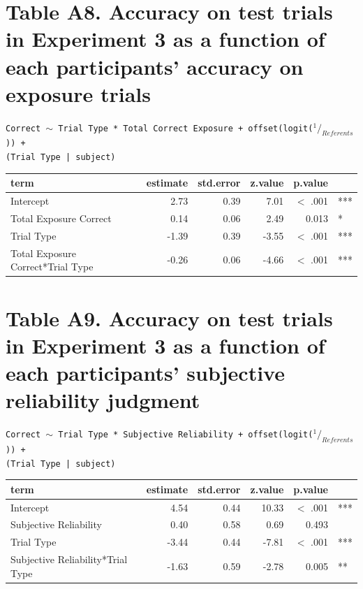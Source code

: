 \documentclass[authoryear, review]{elsarticle}
\begin{document}
\section*{Table A8. Accuracy on test trials in Experiment 3 as a function of each participants' accuracy on exposure trials}

\texttt{Correct $\sim$ Trial Type * Total Correct Exposure + offset(logit($^1/_{Referents}$)) + \\ (Trial Type | subject)}

\begin{table}[h]
\centering
\begin{tabular}{lrrrrl}
 term & estimate & std.error & z.value & p.value &  \\ 
  \hline
Intercept & 2.73 & 0.39 & 7.01 & $<$ .001 & *** \\ 
  Total Exposure Correct & 0.14 & 0.06 & 2.49 & 0.013 & * \\ 
  Trial Type & -1.39 & 0.39 & -3.55 & $<$ .001 & *** \\ 
  Total Exposure Correct*Trial Type & -0.26 & 0.06 & -4.66 & $<$ .001 & *** \\ 
   \hline
\end{tabular}
\label{tab:e3_acc_gaze_use}
\end{table}

\newpage

\section*{Table A9. Accuracy on test trials in Experiment 3 as a function of each participants' subjective reliability judgment}

\texttt{Correct $\sim$ Trial Type * Subjective Reliability + offset(logit($^1/_{Referents}$)) + \\ (Trial Type | subject)}

\begin{table}[h]
\centering
\begin{tabular}{lrrrrl}
 term & estimate & std.error & z.value & p.value &  \\ 
  \hline
Intercept & 4.54 & 0.44 & 10.33 & $<$ .001 & *** \\ 
  Subjective Reliability & 0.40 & 0.58 & 0.69 & 0.493 &  \\ 
  Trial Type & -3.44 & 0.44 & -7.81 & $<$ .001 & *** \\ 
  Subjective Reliability*Trial Type & -1.63 & 0.59 & -2.78 & 0.005 & ** \\ 
   \hline
\end{tabular}
\label{tab:e3_acc_subj_rel}
\end{table}
\end{document}
